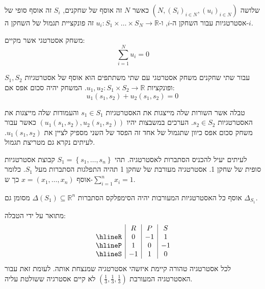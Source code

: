 \documentclass{tstextbook}
\begin{document}
\begin{definition}
שלושה \((N,(S_{i})_{i\in N},(u_{i})_{i\in N})\) כאשר \(N\) זה אוסף של שחקנים, \(S_{i}\) זה אוסף סופי של אסטרטגיות עבור השחקן ה-\(i\), ו-\(u_{i}:S_{1}\times\dots \times S_{N}\to \mathbb{R}\) זה פונקציית תגמול של השחקן ה-\(i\).

\end{definition}
\begin{definition}
משחק אסטרטגי אשר מקיים:
$$\sum_{i=1}^{N} u_{i} = 0$$

\end{definition}
\begin{corollary}
עבור שתי שחקנים משחק אסטרטגי עם שתי משתתפים הוא אוסף של אסטרטגיות \(S_{1},S_{2}\) ופונקציות \(u_{1},u_{2}:S_{1}\times S_{2}\to \mathbb{R}\). המשחק יהיה סכום אפס אם:
$$u_{1}(s_{1},s_{2})+u_{2}(s_{1},s_{2})=0\,$$

\end{corollary}
\begin{definition}
טבלה אשר השורות שלה מייצגות את האסטרטגיות \(s_{1} \in S_{1}\) והעמודות שלה מייצגות את האסטרטגיות \(s_{2} \in S_{2}\). הערכים במשבצות יהיו \((u_{1}(s_{1},s_{2}),u_{2}(s_{1},s_{2}))\) כאשר עבור משחק סכום אפס כיוון שתגמול של אחד זה הפסד של השני מספיק לציין את \(u_{1}(s_{1},s_{2})\). לעיתים נקרא גם מטריצת תגמול.

\end{definition}
\begin{definition}
לעיתים יעיל להכניס הסתברות לאסטרטגיה. תהי \(S_{1}=\left\{  s_{1},\dots,s_{n}  \right\}\) קבוצת אסטרטגיות סופית של שחקן 1. אסטרטגיה מעורבת של שחקן 1 תהיה התפלגות הסתברות מעל \(S_{1}\). כלומר אוסף \(x=\left( x_{1},\dots,x_{n} \right)\) כך ש-\(\sum_{i=1}^{n}x_{i}=1\).

\end{definition}
\begin{remark}
אוסף כל האסטרטגיות המעורבות יהיה הסימפלקס הסתברות \(\Delta(S_{1})\subseteq\mathbb{R}^{n}\) מסומן גם \(\Delta _{S_{1}}\).

\end{remark}
\begin{example}
מתואר על ידי הטבלה:
$$\begin{array}{c|c|c|c}  & R & P & S \\ \hlineR & 0 & -1 & 1 \\ \hlineP & 1 & 0 & -1 \\ \hlineS  & -1 &1 & 0 
\end{array}$$
לכל אסטרטגיה טהורה קיימת איזשהי אסטרטגיה שמנצחת אותה. לעומת זאת עבור האסטרטגיה המעורבת \(\left( \frac{1}{3},\frac{1}{3},\frac{1}{3} \right)\) לא קיים אסטרגיה ששולטת עליה.

\end{example}
\end{document}

